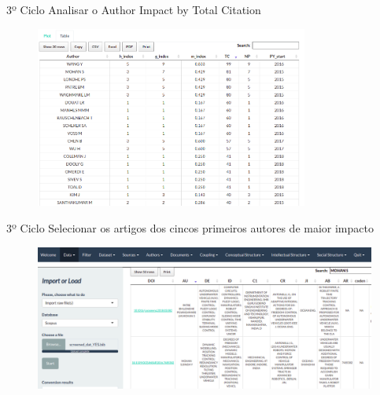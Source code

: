 \begin{frame}{3º Ciclo}
  Analisar o Author Impact by Total Citation
	\begin{figure}[hb]
    \includegraphics[width=0.8\textwidth]{figures/autoimpact2.png}
  \end{figure}
\end{frame}

\begin{frame}{3º Ciclo}
  Selecionar os artigos dos cincos primeiros autores de maior impacto
	\begin{figure}[hb]
    \includegraphics[width=1\textwidth]{figures/buscarartigo.png}
  \end{figure}
\end{frame}

